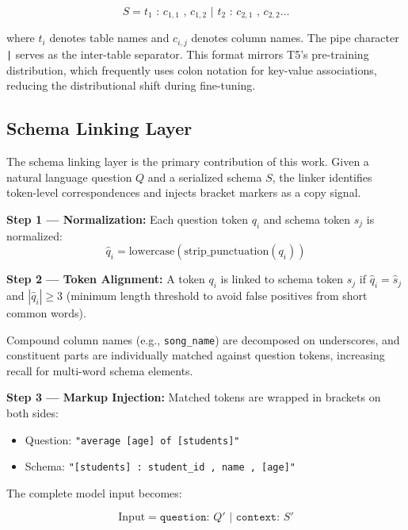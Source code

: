 \documentclass[conference]{IEEEtran}
\begin{document}
\begin{equation}
S = t_1 \texttt{ : } c_{1,1} \texttt{ , } c_{1,2} \texttt{ | } t_2 \texttt{ : } c_{2,1} \texttt{ , } c_{2,2} \ldots
\end{equation}

where $t_i$ denotes table names and $c_{i,j}$ denotes column names. The pipe character \texttt{|} serves as the inter-table separator. This format mirrors T5's pre-training distribution, which frequently uses colon notation for key-value associations, reducing the distributional shift during fine-tuning.

\subsection{Schema Linking Layer}

The schema linking layer is the primary contribution of this work. Given a natural language question $Q$ and a serialized schema $S$, the linker identifies token-level correspondences and injects bracket markers as a copy signal.

\textbf{Step 1 — Normalization:} Each question token $q_i$ and schema token $s_j$ is normalized:
\begin{equation}
\hat{q}_i = \text{lowercase}(\text{strip\_punctuation}(q_i))
\end{equation}

\textbf{Step 2 — Token Alignment:} A token $q_i$ is linked to schema token $s_j$ if $\hat{q}_i = \hat{s}_j$ and $|\hat{q}_i| \geq 3$ (minimum length threshold to avoid false positives from short common words).

Compound column names (e.g., \texttt{song\_name}) are decomposed on underscores, and constituent parts are individually matched against question tokens, increasing recall for multi-word schema elements.

\textbf{Step 3 — Markup Injection:} Matched tokens are wrapped in brackets on both sides:

\begin{itemize}
    \item Question: \texttt{"average [age] of [students]"}
    \item Schema: \texttt{"[students] : student\_id , name , [age]"}
\end{itemize}

The complete model input becomes:

\begin{equation}
\text{Input} = \texttt{question: } Q' \texttt{ | context: } S'
\end{equation}
\end{document}
